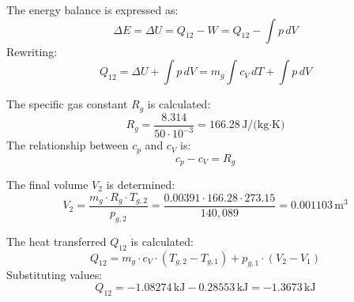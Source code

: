 The energy balance is expressed as:  
\[
\Delta E = \Delta U = Q_{12} - W = Q_{12} - \int p \, dV
\]  
Rewriting:  
\[
Q_{12} = \Delta U + \int p \, dV = m_g \int c_V \, dT + \int p \, dV
\]  

The specific gas constant \( R_g \) is calculated:  
\[
R_g = \frac{8.314}{50 \cdot 10^{-3}} = 166.28 \, \text{J/(kg·K)}
\]  
The relationship between \( c_p \) and \( c_V \) is:  
\[
c_p - c_V = R_g
\]  

The final volume \( V_2 \) is determined:  
\[
V_2 = \frac{m_g \cdot R_g \cdot T_{g,2}}{p_{g,2}} = \frac{0.00391 \cdot 166.28 \cdot 273.15}{140,089} = 0.001103 \, \text{m}^3
\]  

The heat transferred \( Q_{12} \) is calculated:  
\[
Q_{12} = m_g \cdot c_V \cdot (T_{g,2} - T_{g,1}) + p_{g,1} \cdot (V_2 - V_1)
\]  
Substituting values:  
\[
Q_{12} = -1.08274 \, \text{kJ} - 0.28553 \, \text{kJ} = -1.3673 \, \text{kJ}
\]